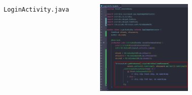 \documentclass{beamer}
\begin{document}
\begin{frame}
\begin{columns}
\begin{figure}
        \end{figure}
        \indent \texttt{LoginActivity.java}
        \begin{figure}
            \centering
            \includegraphics[width=\textwidth]{images/29.png}
        \end{figure}
    \end{columns}
\end{frame}
\end{document}
